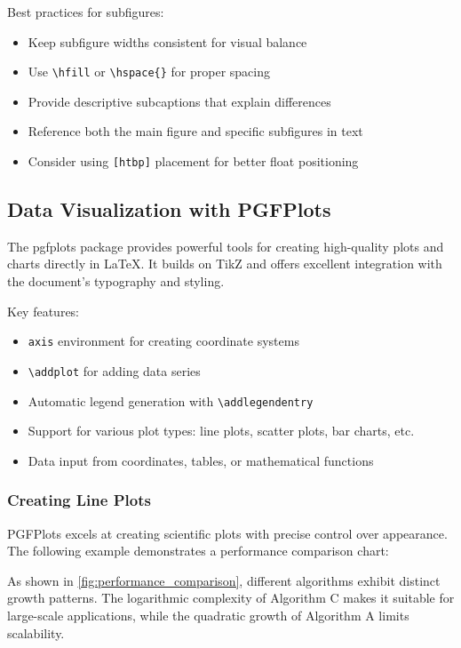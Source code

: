 Best practices for subfigures:
\begin{itemize}
    \item Keep subfigure widths consistent for visual balance
    \item Use \verb+\hfill+ or \verb+\hspace{}+ for proper spacing
    \item Provide descriptive subcaptions that explain differences
    \item Reference both the main figure and specific subfigures in text
    \item Consider using \verb+[htbp]+ placement for better float positioning
\end{itemize}

\subsection{Data Visualization with PGFPlots}

The pgfplots package provides powerful tools for creating high-quality plots and charts directly in LaTeX. It builds on TikZ and offers excellent integration with the document's typography and styling.

Key features:
\begin{itemize}
    \item \verb+axis+ environment for creating coordinate systems
    \item \verb+\addplot+ for adding data series
    \item Automatic legend generation with \verb+\addlegendentry+
    \item Support for various plot types: line plots, scatter plots, bar charts, etc.
    \item Data input from coordinates, tables, or mathematical functions
\end{itemize}

\subsubsection{Creating Line Plots}

PGFPlots excels at creating scientific plots with precise control over appearance. The following example demonstrates a performance comparison chart:



As shown in \cref{fig:performance_comparison}, different algorithms exhibit distinct growth patterns. The logarithmic complexity of Algorithm C makes it suitable for large-scale applications, while the quadratic growth of Algorithm A limits scalability.

